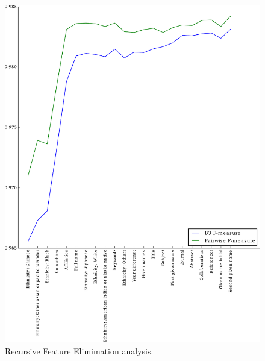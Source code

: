 \documentclass{article}
\begin{document}
\begin{figure}
\centering
\caption{Recursive Feature Elimimation analysis. }
\label{fig:rfe}
\includegraphics[width=\textwidth]{figures/rfe.pdf}
\end{figure}
\end{document}
